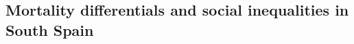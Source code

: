 \documentclass[a4paper,10pt,oneside,english]{article}
\begin{document}

\subsection*{\textsf{Mortality differentials and social inequalities in South Spain}}
\end{document}
